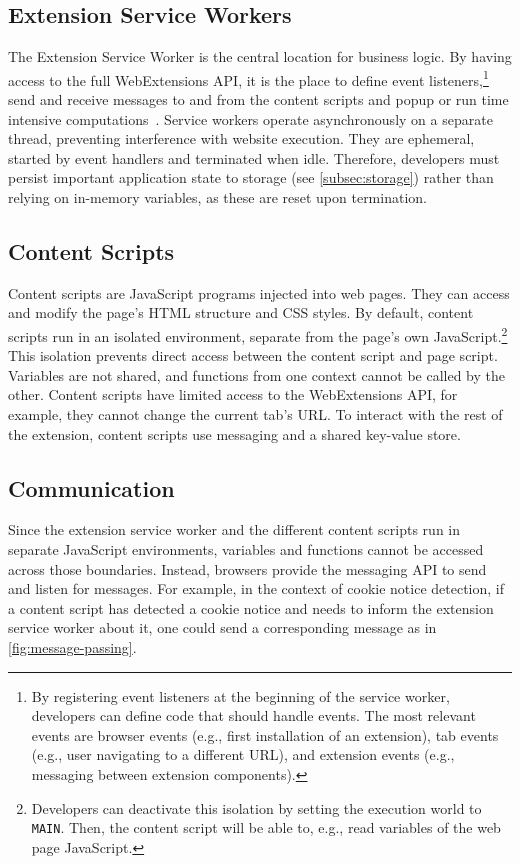 \subsection{Extension Service Workers} \label{subsec:service-workers}
The Extension Service Worker is the central location for business logic.
By having access to the full WebExtensions API, it is the place to define event listeners,\footnote{
By registering event listeners at the beginning of the service worker, developers can define code that should handle events.
The most relevant events are browser events (e.g., first installation of an extension), tab events (e.g., user navigating to a different URL), and extension events (e.g., messaging between extension components).}
send and receive messages to and from the content scripts and popup
or run time intensive computations~\cite[Ch. 4]{frisbie2023browser}.
Service workers operate asynchronously on a separate thread, preventing interference with website execution. 
They are ephemeral, started by event handlers and terminated when idle.
Therefore, developers must persist important application state to storage (see \cref{subsec:storage}) rather than relying on in-memory variables, as these are reset upon termination.

\subsection{Content Scripts} \label{subsec:content-scripts}
Content scripts are JavaScript programs injected into web pages. 
They can access and modify the page's HTML structure and CSS styles.
By default, content scripts run in an isolated environment, separate from the page's own JavaScript.\footnote{
Developers can deactivate this isolation by setting the execution world to \texttt{MAIN}. Then, the content script will be able to, e.g., read variables of the web page JavaScript.
}
This isolation prevents direct access between the content script and page script.
Variables are not shared, and functions from one context cannot be called by the other.
Content scripts have limited access to the WebExtensions API, for example, they cannot change the current tab's URL.
To interact with the rest of the extension, content scripts use messaging and a shared key-value store.

\subsection{Communication}
Since the extension service worker and the different content scripts run in separate JavaScript environments, variables and functions cannot be accessed across those boundaries.
Instead, browsers provide the messaging API to send and listen for messages.
For example, in the context of cookie notice detection, if a content script has detected a cookie notice and needs to inform the extension service worker about it, one could send a corresponding message as in \cref{fig:message-passing}.

